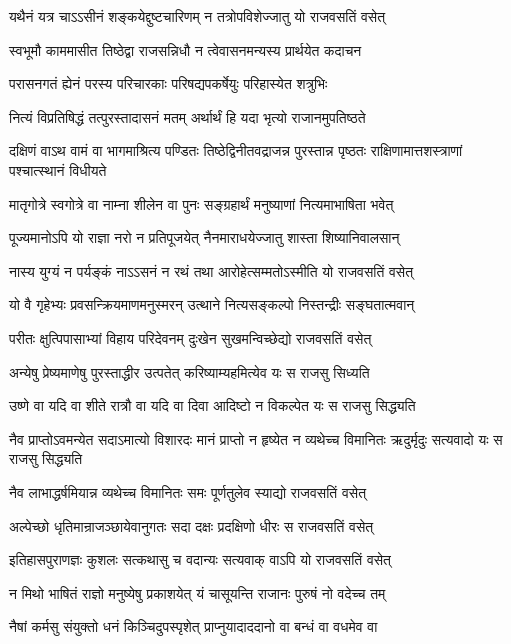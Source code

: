 \twolineshloka
{यथैनं यत्र चाऽऽसीनं शङ्कयेद्दुष्टचारिणम्}
{न तत्रोपविशेज्जातु यो राजवसतिं वसेत्}


\twolineshloka
{स्वभूमौ काममासीत तिष्ठेद्वा राजसन्निधौ}
{न त्वेवासनमन्यस्य प्रार्थयेत कदाचन}


\twolineshloka
{परासनगतं ह्येनं परस्य परिचारकाः}
{परिषद्यपकर्षेयुः परिहास्येत शत्रुभिः}


\twolineshloka
{नित्यं विप्रतिषिद्धं तत्पुरस्तादासनं मतम्}
{अर्थार्थं हि यदा भृत्यो राजानमुपतिष्ठते}


\threelineshloka
{दक्षिणं वाऽथ वामं वा भागमाश्रित्य पण्डितः}
{तिष्ठेद्विनीतवद्राजन्न पुरस्तान्न पृष्ठतः}
{राक्षिणामात्तशस्त्राणां पश्चात्स्थानं विधीयते}


\twolineshloka
{मातृगोत्रे स्वगोत्रे वा नाम्ना शीलेन वा पुनः}
{सङ्ग्रहार्थं मनुष्याणां नित्यमाभाषिता भवेत्}


\twolineshloka
{पूज्यमानोऽपि यो राज्ञा नरो न प्रतिपूजयेत्}
{नैनमाराधयेज्जातु शास्ता शिष्यानिवालसान्}


\twolineshloka
{नास्य युग्यं न पर्यङ्कं नाऽऽसनं न रथं तथा}
{आरोहेत्सम्मतोऽस्मीति यो राजवसतिं वसेत्}


\twolineshloka
{यो वै गृहेभ्यः प्रवसन्क्रियमाणमनुस्मरन्}
{उत्थाने नित्यसङ्कल्पो निस्तन्द्रीः सङ्घतात्मवान्}


\twolineshloka
{परीतः क्षुत्पिपासाभ्यां विहाय परिदेवनम्}
{दुःखेन सुखमन्विच्छेद्यो राजवसतिं वसेत्}


\twolineshloka
{अन्येषु प्रेष्यमाणेषु पुरस्ताद्धीर उत्पतेत्}
{करिष्याम्यहमित्येव यः स राजसु सिध्यति}


\twolineshloka
{उष्णे वा यदि वा शीते रात्रौ वा यदि वा दिवा}
{आदिष्टो न विकल्पेत यः स राजसु सिद्ध्यति}


\threelineshloka
{नैव प्राप्तोऽवमन्येत सदाऽमात्यो विशारदः}
{मानं प्राप्तो न हृष्येत न व्यथेच्च विमानितः}
{ऋदुर्मृदुः सत्यवादो यः स राजसु सिद्ध्यति}


\twolineshloka
{नैव लाभाद्धर्षमियान्न व्यथेच्च विमानितः}
{समः पूर्णतुलेव स्याद्यो राजवसतिं वसेत्}


\twolineshloka
{अल्पेच्छो धृतिमान्राजञ्छायेवानुगतः सदा}
{दक्षः प्रदक्षिणो धीरः स राजवसतिं वसेत्}


\twolineshloka
{इतिहासपुराणज्ञः कुशलः सत्कथासु च}
{वदान्यः सत्यवाक् वाऽपि यो राजवसतिं वसेत्}


\twolineshloka
{न मिथो भाषितं राज्ञो मनुष्येषु प्रकाशयेत्}
{यं चासूयन्ति राजानः पुरुषं नो वदेच्च तम्}


\twolineshloka
{नैषां कर्मसु संयुक्तो धनं किञ्चिदुपस्पृशेत्}
{प्राप्नुयादाददानो वा बन्धं वा वधमेव वा}


